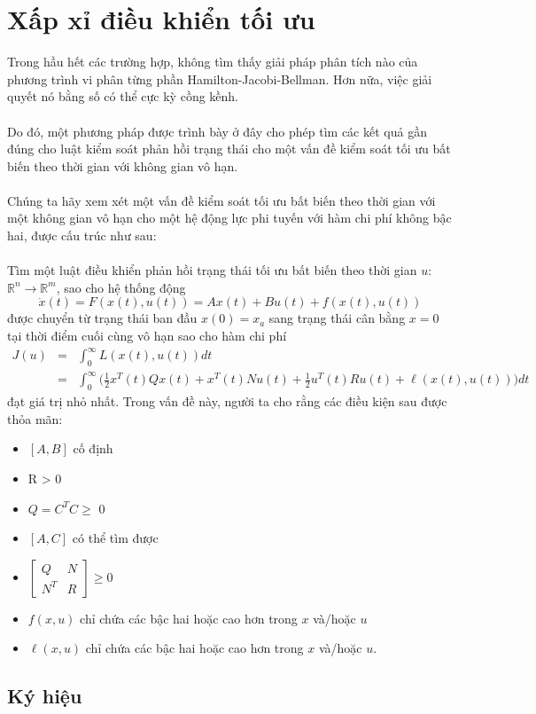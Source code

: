 \documentclass[12pt,a4paper]{report}
\begin{document}
\section{Xấp xỉ điều khiển tối ưu}
Trong hầu hết các trường hợp, không tìm thấy giải pháp phân tích nào của phương trình vi phân từng phần Hamilton-Jacobi-Bellman. Hơn nữa, việc giải quyết nó bằng số có thể cực kỳ cồng kềnh.\\\\
Do đó, một phương pháp được trình bày ở đây cho phép tìm các kết quả gần đúng cho luật kiểm soát phản hồi trạng thái cho một vấn đề kiểm soát tối ưu bất biến theo thời gian với không gian vô hạn.\\\\ Chúng ta hãy xem xét một vấn đề kiểm soát tối ưu bất biến theo thời gian với một không gian vô hạn cho một hệ động lực phi tuyến với hàm chi phí không bậc hai, được cấu trúc như sau: \\\\ Tìm một luật điều khiển phản hồi trạng thái tối ưu bất biến theo thời gian $u$: $\mathbb{R}^n \to \mathbb{R}^m$, sao cho hệ thống động $$\dot{x}(t) = F(x(t), u(t)) = Ax(t) + Bu(t) + f(x(t), u(t))$$ được chuyển từ trạng thái ban đầu $x(0) = x_a$ sang trạng thái cân bằng $x = 0$ tại thời điểm cuối cùng vô hạn sao cho hàm chi phí \begin{eqnarray}
	J(u) &=& \int_{0}^{\infty}L(x(t), u(t))dt \nonumber \\
	&=& \int_{0}^{\infty}\Big(\frac{1}{2}x^T(t)Qx(t) + x^T(t)Nu(t) + \frac{1}{2}u^T(t)Ru(t) + \ell(x(t), u(t)) \Big)dt \nonumber 
\end{eqnarray} đạt giá trị nhỏ nhất.
Trong vấn đề này, người ta cho rằng các điều kiện sau được thỏa mãn: \begin{itemize}
	\item $[A, B]$ cố định
	\item R > 0
	\item $Q = C^TC \geq$ 0
	\item $[A, C]$ có thể tìm được
	\item $\begin{bmatrix}
	Q&N\\N^T&R
	\end{bmatrix} \geq 0$
	\item $f(x, u)$ chỉ chứa các bậc hai hoặc cao hơn trong $x$ và/hoặc $u$
	\item $\ell(x, u)$ chỉ chứa các bậc hai hoặc cao hơn trong $x$ và/hoặc $u$.
\end{itemize}
\subsection{Ký hiệu}
\end{document}
